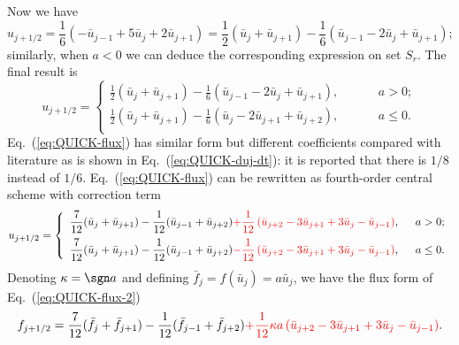 \documentclass[]{article}
\begin{document}
Now we have
\[u_{j+1/2}=\frac{1}{6}(-\bar u_{j-1}+5\bar u_j+2\bar u_{j+1})=\frac{1}{2}(\bar
u_j+\bar u_{j+1})-\frac{1}{6}(\bar u_{j-1}-2\bar u_j+\bar u_{j+1});\]
similarly, when $a<0$ we can deduce the corresponding expression on set
$S_r$. The final result is
\begin{equation}
    u_{j+1/2}=\left\{\begin{array}{ll}
	\displaystyle
	\frac{1}{2}(\bar u_j+\bar u_{j+1})-\frac{1}{6}(\bar u_{j-1}-2\bar u_j+\bar u_{j+1}),\hspace{1cm} & a>0;\\[3mm]
	\displaystyle
	\frac{1}{2}(\bar u_j+\bar u_{j+1})-\frac{1}{6}(\bar u_j-2\bar
	u_{j+1}+\bar u_{j+2}),\hspace{1cm} & a\leq 0.\\
    \end{array}\right.
    \label{eq:QUICK-flux}
\end{equation}
Eq.~(\ref{eq:QUICK-flux}) has similar form but different coefficients compared
with literature \cite{leonard1979stable} as is shown in
Eq.~(\ref{eq:QUICK-duj-dt}): it is reported that there is $1/8$
instead of $1/6$.
Eq.~(\ref{eq:QUICK-flux}) can be rewritten as fourth-order central scheme with
correction term
\begin{equation}
    u_{j+1/2}=\left\{\begin{array}{ll}
	\displaystyle
	\frac{7}{12}(\bar u_j+\bar u_{j+1})-\frac{1}{12}(\bar u_{j-1}+\bar u_{j+2}){\color{red}+\frac{1}{12}\left(\bar u_{j+2}-3\bar u_{j+1}+3\bar u_{j}-\bar u_{j-1} \right)}     ,\hspace{2mm} & a>0;\\[3mm]
	\displaystyle
	\frac{7}{12}(\bar u_j+\bar u_{j+1})-\frac{1}{12}(\bar u_{j-1}+\bar
	u_{j+2}){\color{red}-\frac{1}{12}\left(\bar u_{j+2}-3\bar u_{j+1}+3\bar
	u_{j}-\bar u_{j-1} \right)}     ,\hspace{2mm} & a\leq 0.\\
    \end{array}\right.
    \label{eq:QUICK-flux-2}
\end{equation}
Denoting $\kappa = \sgn a$ and defining $\bar f_j = f(\bar u_j) = a\bar u_j$, we
have the flux form of Eq.~(\ref{eq:QUICK-flux-2})
\begin{equation}
    f_{j+1/2}=
    \frac{7}{12}(\bar f_j+\bar f_{j+1})-\frac{1}{12}(\bar f_{j-1}+\bar
    f_{j+2}){\color{red}+\frac{1}{12}\kappa a\left(\bar u_{j+2}-3\bar u_{j+1}+3\bar
    u_{j}-\bar u_{j-1} \right)}.
    \label{eq:QUICK-flux-3}
\end{equation}
\end{document}
